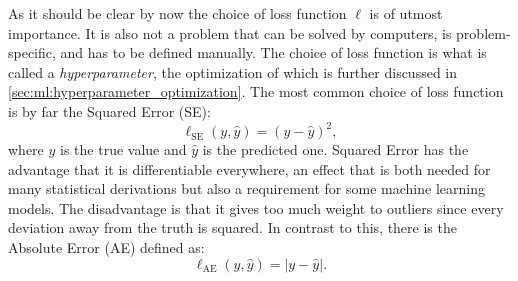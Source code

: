 \documentclass[a4paper, twoside, nobib]{tufte-book}
\newcommand{\abs}[1]{\lvert#1\rvert}
\begin{document}
As it should be clear by now the choice of loss function $\ell$ is of utmost importance. It is also not a problem that can be solved by computers, is problem-specific, and has to be defined manually. The choice of loss function is what is called a \emph{hyperparameter}, the optimization of which is further discussed in \autoref{sec:ml:hyperparameter_optimization}. The most common choice of loss function is by far the Squared Error (SE): 
\begin{equation}
  \ell_\mathrm{SE}(y, \hat{y}) = \left( y-\hat{y} \right)^2,
\end{equation}
where $y$ is the true value and $\hat{y}$ is the predicted one. Squared Error has the advantage that it is differentiable everywhere, an effect that is both needed for many statistical derivations but also a requirement for some machine learning models. The disadvantage is that it gives too much weight to outliers since every deviation away from the truth is squared. In contrast to this, there is the Absolute Error (AE) defined as:
\begin{equation}
  \ell_\mathrm{AE}(y, \hat{y})  = \abs{y-\hat{y} }.
\end{equation}
\end{document}
